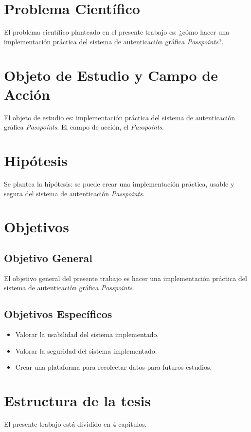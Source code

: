 \section*{Problema Científico}
El problema científico planteado en el presente trabajo es: ¿cómo hacer una implementación práctica del sistema de autenticación gráfica \textit{Passpoints}?.
\section*{Objeto de Estudio y Campo de Acción}
El objeto de estudio es: implementación práctica del sistema de autenticación gráfica  \textit{Passpoints}. 
El campo de acción, el \textit{Passpoints}.
\section*{Hipótesis}
Se plantea la hipótesis: se puede crear una implementación práctica, usable y segura
del sistema de autenticación \textit{Passpoints}.

\section*{Objetivos}
\subsection*{Objetivo General}
El objetivo general del presente trabajo es
hacer una implementación práctica del sistema de autenticación gráfica \textit{Passpoints}.

\subsection*{Objetivos Específicos}
\begin{itemize}
	\item  Valorar la usabilidad del sistema implementado.
	\item Valorar la seguridad del sistema implementado.
	\item  Crear una plataforma para recolectar datos para futuros estudios.
\end{itemize}


\section*{Estructura de la tesis}
El presente trabajo está dividido en 4 capítulos.

